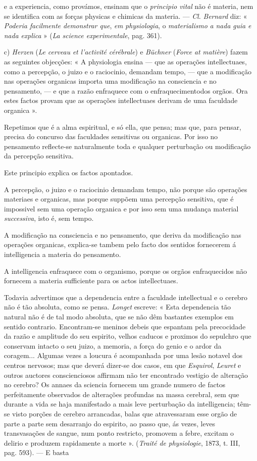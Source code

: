 e a experiencia, como provámos, ensinam que o \emph{principio vital} não é materia, nem se identifica com as forças physicas e chimicas da materia. --- \emph{Cl. Bernard} diz: « \emph{Poderia facilmente demonstrar que}, \emph{em physiologia}, o \emph{materialismo a nada guia e nada explica} » (\emph{La science experimentale}, pag. 361).\par c) \emph{Herzen} (\emph{Le cerveau et l'activité cérébrale}) e \emph{Büchner} (\emph{Force at matière}) fazem as seguintes objecções: « A physiologia ensina --- que as operações intellectuaes, como a percepção, o juizo e o raciocinio, demandam tempo, --- que a modificação nas operações organicas importa uma modificação na consciencia e no pensamento, --- e que a razão enfraquece com o enfraquecimentodos orgãos. Ora estes factos provam que as operações intellectuaes derivam de uma faculdade organica ».\par Repetimos que é a alma espiritual, e só ella, que pensa; mas que, para pensar, precisa do concurso das faculdades sensitivas ou organicas. Por isso no pensamento reflecte-se naturalmente toda e qualquer perturbação ou modificação da percepção sensitiva.\par Este principio explica os factos apontados.\par A percepção, o juizo e o raciocinio demandam tempo, não porque são operações materiaes e organicas, mas porque suppõem uma percepção sensitiva, que é impossivel sem uma operação organica e por isso sem uma mudança material \emph{successiva}, isto é, sem tempo.\par A modificação na consciencia e no pensamento, que deriva da modificação nas operações organicas, explica-se tambem pelo facto dos sentidos fornecerem á intelligencia a materia do pensamento.\par A intelligencia enfraquece com o organismo, porque os orgãos enfraquecidos não fornecem a materia sufficiente para os actos intellectuaes.\par Todavia advertimos que a dependencia entre a faculdade intellectual e o cerebro não é tão absoluta, como se pensa. \emph{Longet} escreve: « Esta dependencia tão natural não é de tal modo absoluta, que se não dêm bastantes exemplos em sentido contrario. Encontram-se meninos debeis que espantam pela precocidade da razão e amplitude do seu espirito, velhos caducos e proximos do sepulchro que conservam intacto o seu juizo, a memoria, a força do genio e o ardor da coragem... Algumas vezes a loucura é acompanhada por uma lesão notavel dos centros nervosos; mas que deverá dizer-se dos casos, em que \emph{Esquirol}, \emph{Leuret} e outros auctores conscienciosos affirmam não ter encontrado vestigio de alteração no cerebro? Os annaes da sciencia fornecem um grande numero de factos perfeitamente observados de alterações profundas na massa cerebral, sem que durante a vida se haja manifestado a mais leve perturbação da intelligencia; têm-se visto porções de cerebro arrancadas, balas que atravessaram esse orgão de parte a parte sem desarranjo do espirito, ao passo que, ás vezes, leves transvasações de sangue, num ponto restricto, promovem a febre, excitam o delirio e produzem rapidamente a morte ». (\emph{Traité de physiologie}, 1873, t. III, pag. 593). --- E basta 